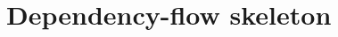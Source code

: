 \clearpage
\section*{Dependency-flow skeleton}

\newcommand{\sknode}[4]{%
  \noindent #1\, \textbf{#2} \;---\; #3\par
  \nobreak\smallskip
  {\footnotesize\color{gray!75}\hspace*{1.6em}#4\par}}

\newcommand{\skstep}[1]{%
  \par\medskip\centerline{$\downarrow$\ \footnotesize\itshape\color{gray!70}#1}\par\medskip}

\newcommand{\sktag}[1]{\hfill{\scriptsize\color{gray!45}#1}}

